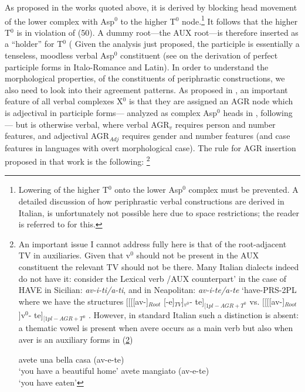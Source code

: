 \documentclass[output=paper]{langscibook}
\begin{document}
As proposed in the works quoted above, it is derived by blocking head movement of the lower complex with Asp$^0$ to the higher T$^0$ node.\footnote{Lowering of the higher T$^0$ onto the lower Asp$^0$ complex must be prevented. A detailed discussion of how periphrastic verbal constructions are derived in Italian, is unfortunately not possible here due to space restrictions; the reader is referred to \cite{calabrese2019a} for this.} It follows that the higher T$^0$ is in violation of (50).  A dummy root—the AUX root—is therefore inserted as a “holder” for T$^0$ (\cite{bjorkman2011a} Given the analysis just proposed, the participle is essentially a tenseless, moodless verbal Asp$^0$ constituent (see \cite{calabrese2020a} on the derivation of perfect participle forms in Italo-Romance and Latin).  
 In order to understand the morphological properties, of the constituents of periphrastic constructions, we also need to look into their agreement patterns.  As proposed in \cite{calabrese2019a}, an important feature of all verbal complexes X$^0$ is that they are assigned an AGR node which is adjectival in participle forms— analyzed as complex Asp$^0$ heads in \cite{calabrese2019a}, following \cite{embick2000a, embick2004a}— but is otherwise verbal, where verbal AGR$_v$ requires person and number features, and adjectival AGR$_{Adj}$ requires gender and number features (and case features in languages with overt morphological case). The rule for AGR insertion proposed in that work is the following: \footnote{An important issue I cannot address fully here is that of the root-adjacent TV in auxiliaries.  Given that v$^0$ should not be present in the AUX constituent the relevant TV should not be there.  Many Italian dialects indeed do not have it: consider the  Lexical verb /AUX counterpart’ in the case of HAVE in Sicilian: \textit{av-i-ti/a-ti}, and  in Neapolitan: \textit{av-i-te/a-te} ‘have-PRS-2PL where we have the structures [[[[av-]$_{Root}$ [-e]$_{TV}$]$_{v^0}$- te]$_{[1pl-AGR+T^0}$  vs. [[[[av-]$_{Root}$ ]v$^0$- te]$_{[1pl-AGR+T^0}$ . However, in standard Italian such a distinction is absent: a thematic vowel is present when avere occurs as a main verb but also when aver is an auxiliary forms in (\ref{fn38exb})
 
 \ea \label{fn38ex}
    \ea \label{fn38exa}avete una bella casa (av-e-te)\\
   ‘you have a beautiful home’
    \ex \label{fn38exb}avete mangiato (av-e-te)\\
   ‘you have eaten’
    \z
 \z
 
}
\end{document}
